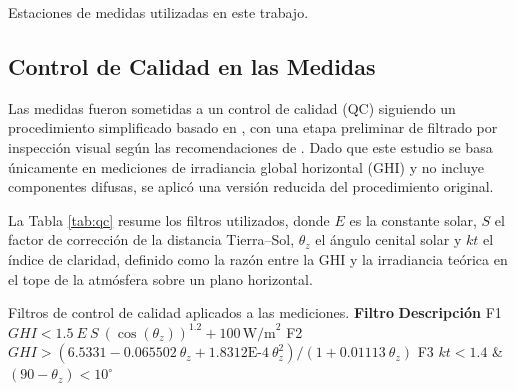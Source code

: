 \documentclass[letterpaper,12pt, twoside]{report}
\providecommand{\DIFdeltex}[1]{{\protect\color{red} \scriptsize #1}} %
\providecommand{\DIFdelFL}[1]{\DIFdel{#1}} %
\providecommand{\DIFdel}[1]{\texorpdfstring{\DIFdeltex{#1}}{}} %
\begin{document}
{%
\DIFdelFL{Estaciones de medidas utilizadas en este trabajo.}}

\subsection{\DIFdel{Control de Calidad en las Medidas}}
\addtocounter{subsection}{-1}%

\DIFdel{Las medidas fueron sometidas a un control de calidad (QC) siguiendo un procedimiento simplificado basado en \cite{Nollas2023}, con una etapa preliminar de filtrado por inspección visual según las recomendaciones de \cite{abal2020}. Dado que este estudio se basa únicamente en mediciones de irradiancia global horizontal (GHI) y no incluye componentes difusas, se aplicó una versión reducida del procedimiento original. 
}%

\DIFdel{La Tabla \ref{tab:qc} resume los filtros utilizados, donde $E$ es la constante solar, $S$ el factor de corrección de la distancia Tierra–Sol, $\theta_z$ el ángulo cenital solar y $kt$ el índice de claridad, definido como la razón entre la GHI y la irradiancia teórica en el tope de la atmósfera sobre un plano horizontal.}%

{%
\DIFdelFL{Filtros de control de calidad aplicados a las mediciones.}}
\DIFdelFL{\textbf{Filtro} }%
\DIFdelFL{\textbf{Descripción}}%
\DIFdelFL{F1 }%
\DIFdelFL{$GHI < 1.5~E~S~(\cos(\theta_z))^{1.2} + 100 \, \text{W/m}^2$  }%
\DIFdelFL{F2 }%
\DIFdelFL{$GHI > (6.5331 - 0.065502~\theta_z + 1.8312\text{E-4}~\theta_z^2)/(1 + 0.01113~\theta_z)$ }%
\DIFdelFL{F3 }%
\DIFdelFL{$kt < 1.4$ \& $ (90-\theta_z) < 10^\circ$  }%
\end{document}
